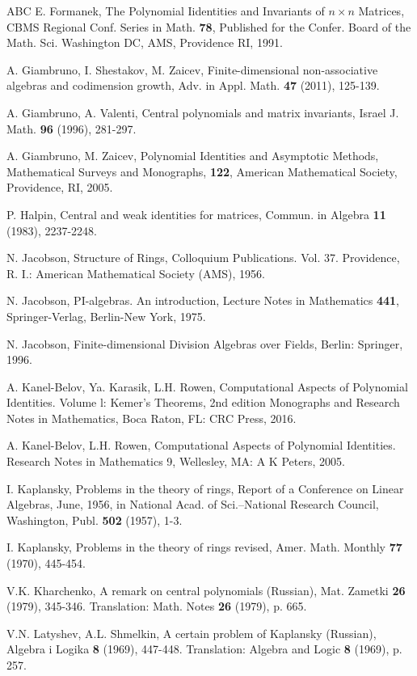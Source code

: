 \documentclass[10]{amsart}
\theoremstyle{definition}
\begin{document}
\begin{thebibliography}{ABC}
E. Formanek,
The Polynomial Iidentities and Invariants of $n \times n$ Matrices,
CBMS Regional Conf. Series in Math. {\bf 78},
Published for the Confer. Board of the Math. Sci. Washington DC,
AMS, Providence RI, 1991.

A. Giambruno, I. Shestakov, M. Zaicev,
Finite-dimensional non-associative algebras and codimension growth,
Adv. in Appl. Math. {\bf 47} (2011), 125-139.

A. Giambruno, A. Valenti, Central polynomials and matrix invariants,
Israel J. Math. {\bf 96} (1996), 281-297.

A. Giambruno, M. Zaicev,
Polynomial Identities and Asymptotic Methods,
Mathematical Surveys and Monographs, {\bf 122},
American Mathematical Society, Providence, RI, 2005.

P. Halpin,
Central and weak identities for matrices,
Commun. in Algebra {\bf 11} (1983), 2237-2248.

N. Jacobson,
Structure of Rings,
Colloquium Publications. Vol. 37. Providence, R. I.: American Mathematical Society (AMS), 1956.

N. Jacobson,
PI-algebras. An introduction,
Lecture Notes in Mathematics {\bf 441}, Springer-Verlag, Berlin-New York, 1975.

N. Jacobson,
Finite-dimensional Division Algebras over Fields,
Berlin: Springer, 1996.

A. Kanel-Belov, Ya. Karasik, L.H. Rowen,
Computational Aspects of Polynomial Identities. Volume l: Kemer's Theorems, 2nd edition
Monographs and Research Notes in Mathematics, Boca Raton, FL: CRC Press, 2016.

A. Kanel-Belov, L.H. Rowen,
Computational Aspects of Polynomial Identities.
Research Notes in Mathematics 9, Wellesley, MA: A K Peters, 2005.

I. Kaplansky,
Problems in the theory of rings,
Report of a Conference on Linear Algebras, June, 1956,
in National Acad. of Sci.--National Research Council, Washington,
Publ. {\bf 502} (1957), 1-3.

I. Kaplansky,
Problems in the theory of rings revised,
Amer. Math. Monthly {\bf 77} (1970), 445-454.

V.K. Kharchenko,
A remark on central polynomials (Russian),
Mat. Zametki {\bf 26} (1979), 345-346.
Translation: Math. Notes {\bf 26} (1979), p. 665.

V.N. Latyshev, A.L. Shmelkin,
A certain problem of Kaplansky (Russian),
Algebra i Logika {\bf 8} (1969), 447-448.
Translation: Algebra and Logic {\bf 8} (1969), p. 257.


\end{thebibliography}
\end{document}
